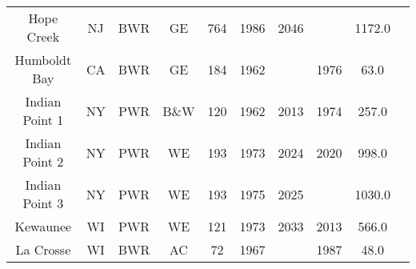 \begin{table}[!h]
\begin{tabular}{c c c c c c c c c c}
    Hope Creek & NJ & BWR & GE & 764 & 1986 & 2046 &  & 1172.0 \\
    Humboldt Bay & CA & BWR & GE & 184 & 1962 &  & 1976 & 63.0 \\
    Indian Point 1 & NY & PWR & B\&W & 120 & 1962 & 2013 & 1974 & 257.0 \\
    Indian Point 2 & NY & PWR & WE & 193 & 1973 & 2024 & 2020 & 998.0 \\
    Indian Point 3 & NY & PWR & WE & 193 & 1975 & 2025 &  & 1030.0 \\
    Kewaunee & WI & PWR & WE & 121 & 1973 & 2033 & 2013 & 566.0 \\
    La Crosse & WI & BWR & AC & 72 & 1967 &  & 1987 & 48.0 \\
    \hline
    \end{tabular}
\end{table}

